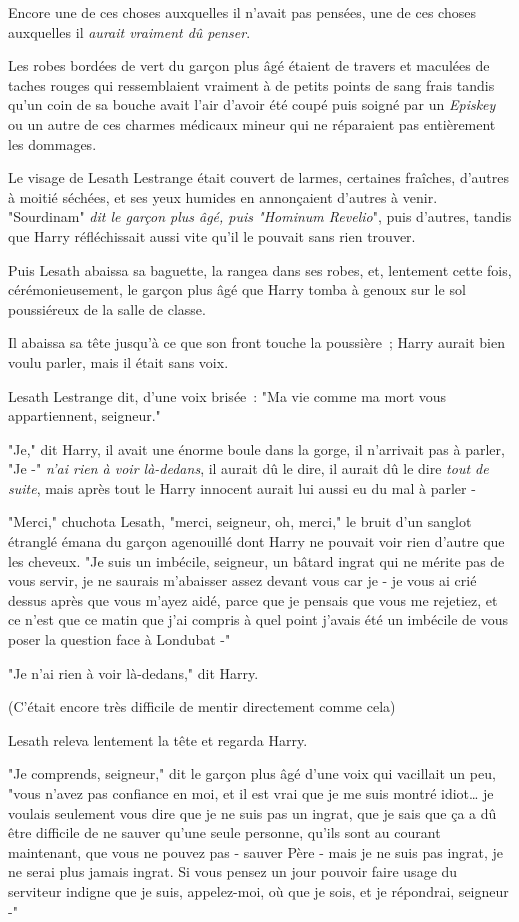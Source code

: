 Encore une de ces choses auxquelles il n'avait pas pensées, une de ces choses auxquelles il \emph{aurait vraiment dû penser}.

Les robes bordées de vert du garçon plus âgé étaient de travers et maculées de taches rouges qui ressemblaient vraiment à de petits points de sang frais tandis qu'un coin de sa bouche avait l'air d'avoir été coupé puis soigné par un \emph{Episkey} ou un autre de ces charmes médicaux mineur qui ne réparaient pas entièrement les dommages.

Le visage de Lesath Lestrange était couvert de larmes, certaines fraîches, d'autres à moitié séchées, et ses yeux humides en annonçaient d'autres à venir. "Sourdinam" \emph{dit le garçon plus âgé, puis "Hominum Revelio}", puis d'autres, tandis que Harry réfléchissait aussi vite qu'il le pouvait sans rien trouver.

Puis Lesath abaissa sa baguette, la rangea dans ses robes, et, lentement cette fois, cérémonieusement, le garçon plus âgé que Harry tomba à genoux sur le sol poussiéreux de la salle de classe.

Il abaissa sa tête jusqu'à ce que son front touche la poussière~; Harry aurait bien voulu parler, mais il était sans voix.

Lesath Lestrange dit, d'une voix brisée~: "Ma vie comme ma mort vous appartiennent, seigneur."

"Je," dit Harry, il avait une énorme boule dans la gorge, il n'arrivait pas à parler, "Je -" \emph{n'ai rien à voir là-dedans}, il aurait dû le dire, il aurait dû le dire \emph{tout de suite}, mais après tout le Harry innocent aurait lui aussi eu du mal à parler -

"Merci," chuchota Lesath, "merci, seigneur, oh, merci," le bruit d'un sanglot étranglé émana du garçon agenouillé dont Harry ne pouvait voir rien d'autre que les cheveux. "Je suis un imbécile, seigneur, un bâtard ingrat qui ne mérite pas de vous servir, je ne saurais m'abaisser assez devant vous car je - je vous ai crié dessus après que vous m'ayez aidé, parce que je pensais que vous me rejetiez, et ce n'est que ce matin que j'ai compris à quel point j'avais été un imbécile de vous poser la question face à Londubat -"

"Je n'ai rien à voir là-dedans," dit Harry.

(C'était encore très difficile de mentir directement comme cela)

Lesath releva lentement la tête et regarda Harry.

"Je comprends, seigneur," dit le garçon plus âgé d'une voix qui vacillait un peu, "vous n'avez pas confiance en moi, et il est vrai que je me suis montré idiot… je voulais seulement vous dire que je ne suis pas un ingrat, que je sais que ça a dû être difficile de ne sauver qu'une seule personne, qu'ils sont au courant maintenant, que vous ne pouvez pas - sauver Père - mais je ne suis pas ingrat, je ne serai plus jamais ingrat. Si vous pensez un jour pouvoir faire usage du serviteur indigne que je suis, appelez-moi, où que je sois, et je répondrai, seigneur -"

